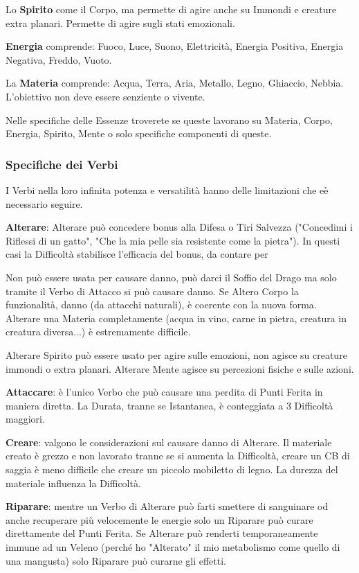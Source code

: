 \documentclass[a4paper,twoside,openany]{book}
\begin{document}
\begin{multicols}{2}
Lo \textbf{Spirito} come il Corpo, ma permette di agire anche su Immondi e creature extra planari. Permette di agire sugli stati emozionali.

\textbf{Energia} comprende: Fuoco, Luce, Suono, Elettricità, Energia Positiva, Energia Negativa, Freddo, Vuoto.

La \textbf{Materia} comprende: Acqua, Terra, Aria, Metallo, Legno, Ghiaccio, Nebbia. L'obiettivo non deve essere senziente o vivente.

\bigskip

Nelle specifiche delle Essenze troverete se queste lavorano su Materia, Corpo, Energia, Spirito, Mente o solo specifiche componenti di queste.

\subsubsection{Specifiche dei Verbi}

I Verbi nella loro infinita potenza e versatilità hanno delle limitazioni che eè necessario seguire.

\textbf{Alterare}:  Alterare può concedere bonus alla Difesa o Tiri Salvezza ("Concedimi i Riflessi di un gatto", "Che la mia pelle sia resistente come la pietra"). In questi casi la Difficoltà stabilisce l'efficacia del bonus, da contare per 

Non può essere usata per causare danno, può darci il Soffio del Drago ma solo tramite il Verbo di Attacco si può causare danno. Se Altero Corpo la funzionalità, danno (da attacchi naturali), è coerente con la nuova forma.
Alterare una Materia completamente (acqua in vino, carne in pietra, creatura in creatura diversa...) è estremamente difficile.

Alterare Spirito può essere usato per agire sulle emozioni, non agisce su creature immondi o extra planari. Alterare Mente agisce su percezioni fisiche e sulle azioni.

\textbf{Attaccare}: è l'unico Verbo che può causare una perdita di Punti Ferita in maniera diretta. La Durata, tranne se Istantanea, è conteggiata a 3 Difficoltà maggiori.

\textbf{Creare}: valgono le considerazioni sul causare danno di Alterare. Il materiale creato è grezzo e non lavorato tranne se si aumenta la Difficoltà, creare un CB di saggia è meno difficile che creare un piccolo mobiletto di legno. La durezza del materiale influenza la Difficoltà.

\textbf{Riparare}: mentre un Verbo di Alterare può farti smettere di sanguinare od anche recuperare più velocemente le energie solo un Riparare può curare direttamente del Punti Ferita. Se Alterare può renderti temporaneamente immune ad un Veleno (perché ho "Alterato" il mio metabolismo come quello di una mangusta) solo Riparare può curarne gli effetti.


\end{multicols}
\end{document}
